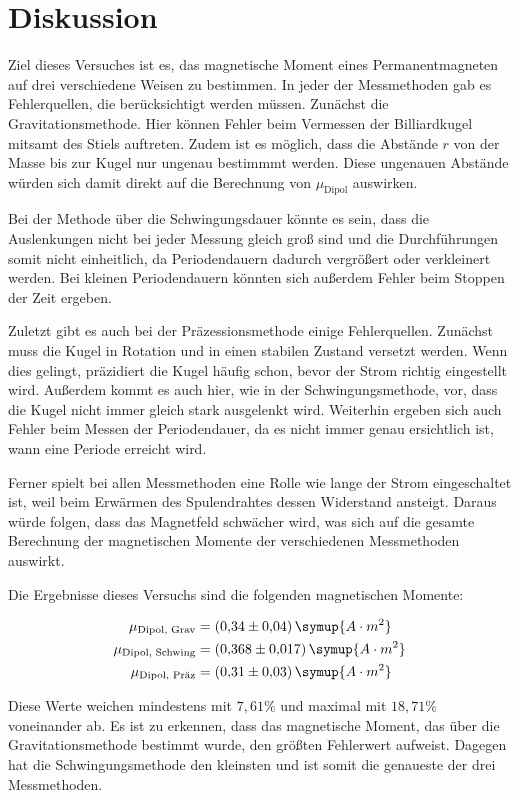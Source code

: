 \newpage 
\section{Diskussion}
Ziel dieses Versuches ist es, das magnetische Moment eines Permanentmagneten auf drei verschiedene Weisen zu bestimmen.
In jeder der Messmethoden gab es Fehlerquellen, die berücksichtigt werden müssen.
Zunächst die Gravitationsmethode. Hier können Fehler beim Vermessen der Billiardkugel mitsamt des Stiels auftreten. 
Zudem ist es möglich, dass die Abstände $r$ von der Masse bis zur Kugel nur ungenau bestimmmt werden. Diese ungenauen Abstände würden sich damit direkt auf die
Berechnung von $\mu_{\text{Dipol}}$ auswirken. 

Bei der Methode über die Schwingungsdauer könnte es sein, dass die Auslenkungen nicht bei jeder Messung gleich groß sind und die 
Durchführungen somit nicht einheitlich, da Periodendauern dadurch vergrößert oder verkleinert werden. Bei kleinen Periodendauern könnten
sich außerdem Fehler beim Stoppen der Zeit ergeben. 

Zuletzt gibt es auch bei der Präzessionsmethode einige Fehlerquellen. Zunächst muss die Kugel in Rotation und in einen stabilen Zustand
versetzt werden. Wenn dies gelingt, präzidiert die Kugel häufig schon, bevor der Strom richtig eingestellt wird. Außerdem kommt
es auch hier, wie in der Schwingungsmethode, vor, dass die Kugel nicht immer gleich stark ausgelenkt wird. Weiterhin ergeben sich 
auch Fehler beim Messen der Periodendauer, da es nicht immer genau ersichtlich ist, wann eine Periode erreicht wird. 

Ferner spielt bei allen Messmethoden eine Rolle wie lange der Strom eingeschaltet ist, weil beim Erwärmen des Spulendrahtes dessen
Widerstand ansteigt. Daraus würde folgen, dass das Magnetfeld schwächer wird, was sich auf die gesamte Berechnung der magnetischen
Momente der verschiedenen Messmethoden auswirkt. 

Die Ergebnisse dieses Versuchs sind die folgenden magnetischen Momente:

\begin{equation*}
\begin{aligned}
\mu_{\text{Dipol, Grav}} &= (0{,}34 \pm 0{,}04)\, \symup{A\cdot m^2} \\
\mu_{\text{Dipol, Schwing}} &= (0{,}368 \pm 0{,}017)\, \symup{A\cdot m^2} \\
\mu_{\text{Dipol, Präz}} &= (0{,}31 \pm 0{,}03)\, \symup{A\cdot m^2} 
\end{aligned}
\end{equation*}

Diese Werte weichen mindestens mit $7{,}61\%$ und maximal mit $18{,}71\%$ voneinander ab. Es ist zu erkennen, dass das magnetische Moment,
das über die Gravitationsmethode bestimmt wurde, den größten Fehlerwert aufweist. Dagegen hat die Schwingungsmethode den kleinsten und ist somit die genaueste der drei Messmethoden.
